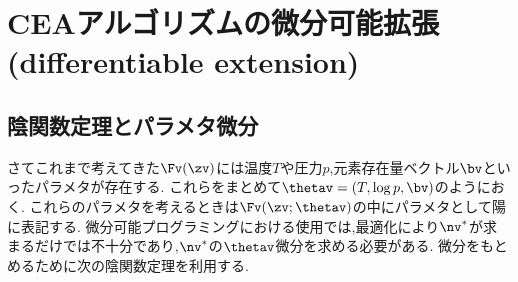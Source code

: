 \section{CEAアルゴリズムの微分可能拡張 (differentiable extension)}

\subsection*{陰関数定理とパラメタ微分}

さてこれまで考えてきた$\Fv(\zv)$には温度$T$や圧力$p$,元素存在量ベクトル$\bv$といったパラメタが存在する. これらをまとめて$\thetav = (T, \log{p}, \bv)$のようにおく. これらのパラメタを考えるときは$\Fv(\zv; \thetav)$の中にパラメタとして陽に表記する. 微分可能プログラミングにおける使用では,最適化により$\nv^\ast$が求まるだけでは不十分であり,$\nv^\ast$の$\thetav$微分を求める必要がある. 微分をもとめるために次の陰関数定理を利用する. 

